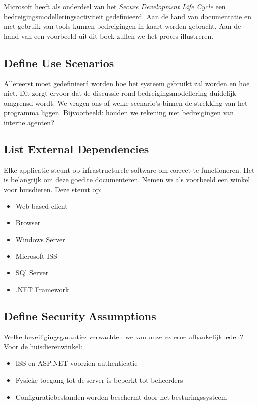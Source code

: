 \documentclass[../main.tex]{subfiles}
\begin{document}
Microsoft heeft als onderdeel van het \textit{Secure Development Life Cycle} een bedreigingsmodelleringsactiviteit gedefinieerd. Aan de hand van documentatie en met gebruik van tools kunnen bedreigingen in kaart worden gebracht. Aan de hand van een voorbeeld uit dit boek zullen we het proces illustreren.

\subsection{Define Use Scenarios}
Allereerst moet gedefinieerd worden hoe het systeem gebruikt zal worden en hoe niet. Dit zorgt ervoor dat de discussie rond bedreigingsmodellering duidelijk omgrensd wordt. We vragen ons af welke scenario's binnen de strekking van het programma liggen. Bijvoorbeeld: houden we rekening met bedreigingen van interne agenten?

\subsection{List External Dependencies}
Elke applicatie steunt op infrastructurele software om correct te functioneren. Het is belangrijk om deze goed te documenteren. Nemen we als voorbeeld een winkel voor huisdieren. Deze steunt op:
\begin{multicols}{2}
\begin{itemize}
	\item Web-based client
	\item Browser
	\item Windows Server
	\item Microsoft ISS
	\item SQl Server 
	\item .NET Framework
\end{itemize}
\end{multicols}

\subsection{Define Security Assumptions}
Welke beveiligingsgaranties verwachten we van onze externe afhankelijkheden? Voor de huisdierenwinkel:
\begin{itemize}
	\item ISS en ASP.NET voorzien authenticatie
	\item Fysieke toegang tot de server is beperkt tot beheerders
	\item Configuratiebestanden worden beschermt door het besturingssysteem
\end{itemize}
\end{document}
